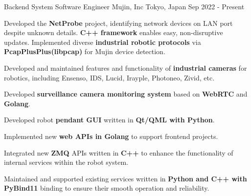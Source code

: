 
\vspace{-2mm}

\begin{cventries}

  \cventry
    {Backend System Software Engineer} %
    {Mujin, Inc} %
    {Tokyo, Japan} %
    {Sep 2022 - Present} %
    {
      \begin{cvitems} %
        \item {
          Developed the \textbf{NetProbe} project, identifying network devices on LAN port despite unknown details.
          \textbf{C++ framework} enables easy, non-disruptive updates.
          Implemented diverse  \textbf{industrial robotic protocols} via \textbf{PcapPlusPlus(libpcap)} for Mujin device detection.
        }
        \item {Developed and maintained features and functionality of \textbf{industrial cameras} for robotics, including Ensenso, IDS, Lucid, Irayple, Photoneo, Zivid, etc.}
        \item {Developed \textbf{surveillance camera monitoring system} based on \textbf{WebRTC} and \textbf{Golang}.}
        \item {Developed robot  \textbf{pendant GUI} written in \textbf{Qt/QML with Python}.}
        \item {Implemented new  \textbf{web APIs in Golang} to support frontend projects.}
        \item {Integrated new  \textbf{ZMQ} APIs written in  \textbf{C++} to enhance the functionality of internal services within the robot system.}
        \item {Maintained and supported existing services written in  \textbf{Python and C++ with PyBind11} binding to ensure their smooth operation and reliability.}
      \end{cvitems}
    }

    \vspace{-2mm}


\end{cventries}
